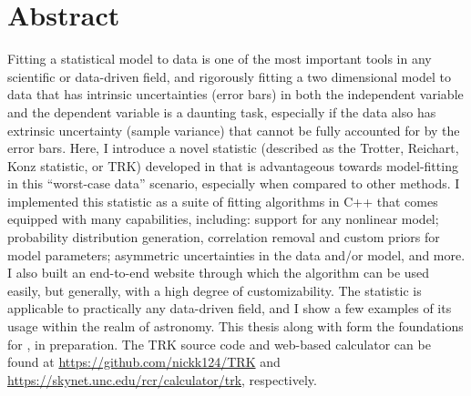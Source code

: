 

\chapter*{Abstract}
\label{cha:section_abstract}
Fitting a statistical model to data is one of the most important tools in any scientific or data-driven field, and rigorously fitting a two dimensional model to data that has intrinsic uncertainties (error bars) in both the independent variable and the dependent variable is a daunting task, especially if the data also has extrinsic uncertainty (sample variance) that cannot be fully accounted for by the error bars. Here, I introduce a novel statistic (described as the Trotter, Reichart, Konz statistic, or TRK) developed in \textcite{trotter} that is advantageous towards model-fitting in this ``worst-case data'' scenario, especially when compared to other methods. I implemented this statistic as a suite of fitting algorithms in C++ that comes equipped with many capabilities, including: support for any nonlinear model; probability distribution generation, correlation removal and custom priors for model parameters; asymmetric uncertainties in the data and/or model, and more. I also built an end-to-end website through which the algorithm can be used easily, but generally, with a high degree of customizability. The statistic is applicable to practically any data-driven field, and I show a few examples of its usage within the realm of astronomy. This thesis along with \textcite{trotter} form the foundations for \textcite{TRKIapjs}, in preparation. The TRK source code and web-based calculator can be found at \url{https://github.com/nickk124/TRK} and \url{https://skynet.unc.edu/rcr/calculator/trk}, respectively.

